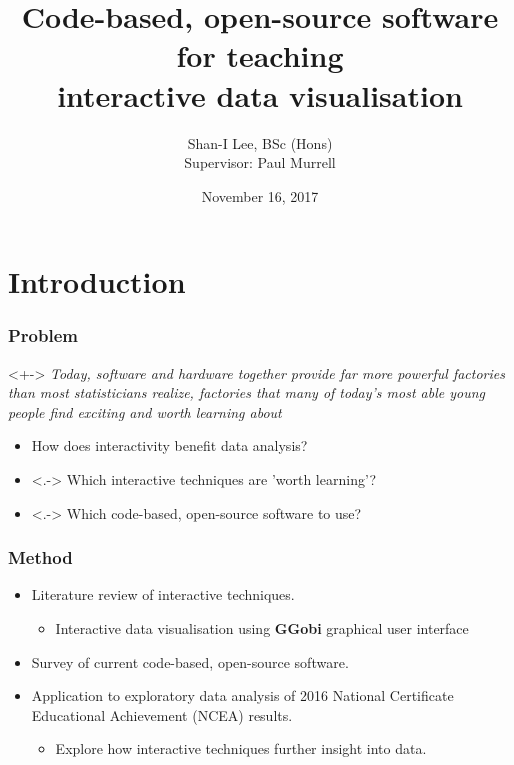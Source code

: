 \documentclass{beamer}
\begin{document}
	\title{Code-based, open-source software for teaching \\ interactive data visualisation}
	
	\date{November 16, 2017}		
	\author{Shan-I Lee, BSc (Hons)\\ Supervisor: Paul Murrell}
	

		\titlepage

	
\section{Introduction}
\label{sec:introduction}
	
	\begin{frame}
		\frametitle{Problem}
		\begin{block}{\citet[p.~25]{Tukey}}<+->
			\textit{Today, software and hardware together provide far more powerful factories than most statisticians realize, factories that many of today's most able young people find exciting and worth learning about} 
		\end{block}
	\begin{itemize}[<+->]
		\item How does interactivity benefit data analysis?
		\item <.-> Which interactive techniques are 'worth learning'? 
		\item <.-> Which code-based, open-source software to use? 
	\end{itemize}
	\end{frame}

	\begin{frame}
		\frametitle{Method}
		\begin{itemize}
			\item Literature review of interactive techniques.
			\begin{itemize}
				\item Interactive data visualisation using \textbf{GGobi} graphical user interface \citep{Cook}
			\end{itemize}
			\item Survey of current code-based, open-source software.
			\item Application to exploratory data analysis of 2016 National Certificate Educational Achievement (NCEA) results.
			\begin{itemize}
				\item Explore how interactive techniques further insight into data.
			\end{itemize}
		\end{itemize}
	\end{frame}
\end{document}
